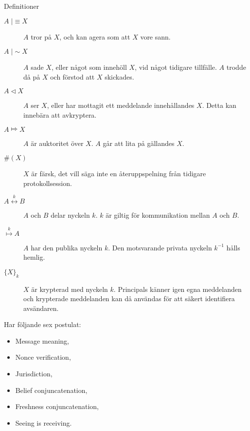 \documentclass{beamer}
\theoremstyle{definition}
\theoremstyle{remark}
\DeclareMathOperator{\believes}{|\!\!\!\equiv}
\DeclareMathOperator{\said}{|\!\!\!\sim}
\DeclareMathOperator{\controls}{\Mapsto}
\DeclareMathOperator{\sees}{\lhd}
\newcommand{\fresh}[1]{\#(#1)}
\newcommand{\encrypt}[2]{\{#1\}_{#2}}
\newcommand{\share}[1]{\stackrel{#1}{\leftrightarrow}}
\newcommand{\pubkey}[1]{\stackrel{#1}{\mapsto}}
\begin{document}
\begin{frame}[allowframebreaks]{Definitioner}
  \begin{description}
    \item[\(A\believes X\)] \(A\) tror på \(X\), och kan agera som att \(X\) 
      vore sann.
    \item[\(A\said X\)] \(A\) sade \(X\), eller något som innehöll \(X\), vid 
      något tidigare tillfälle.
      \(A\) trodde då på \(X\) och förstod att \(X\) skickades.
    \item[\(A\sees X\)] \(A\) ser \(X\), eller har mottagit ett meddelande 
      innehållandes \(X\).
      Detta kan innebära att avkryptera.
    \item[\(A\controls X\)] \(A\) är auktoritet över \(X\).
      \(A\) går att lita på gällandes \(X\).
    \item[\(\fresh X\)] \(X\) är färsk, det vill säga inte en återuppspelning 
      från tidigare protokollsession.
%
    \item[\(A\share{k} B\)] \(A\) och \(B\) delar nyckeln \(k\).
      \(k\) är giltig för kommunikation mellan \(A\) och \(B\).
    \item[\(\pubkey{k} A\)] \(A\) har den publika nyckeln \(k\).
      Den motsvarande privata nyckeln \(k^{-1}\) hålls hemlig.
    \item[\(\encrypt{X}{k}\)] \(X\) är krypterad med nyckeln \(k\).
      Principals känner igen egna meddelanden och krypterade meddelanden kan då 
      användas för att säkert identifiera avsändaren.
  \end{description}
\end{frame}

\begin{frame}
  Har följande sex postulat:
  \begin{itemize}
    \item Message meaning,
    \item Nonce verification,
    \item Jurisdiction,
    \item Belief conjuncatenation,
    \item Freshness conjuncatenation,
    \item Seeing is receiving.
  \end{itemize}
\end{frame}
\end{document}
